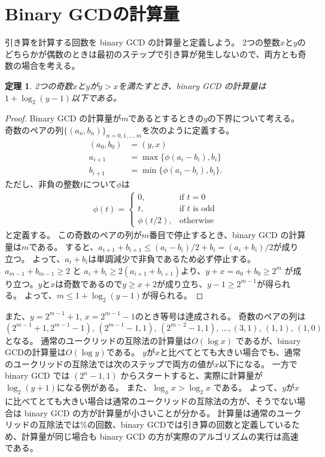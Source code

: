 \documentclass[a4paper,twoside,onecolumn,openany,article,10pt]{memoir}
\newtheorem{theorem}{定理}
\theoremstyle{remark}
\begin{document}
\section{Binary GCDの計算量}
引き算を計算する回数を binary GCD の計算量と定義しよう。
2つの整数$x$と$y$のどちらかが偶数のときは最初のステップで引き算が発生しないので、両方とも奇数の場合を考える。
\begin{theorem}
2つの奇数$x$と$y$が$y>x$を満たすとき、binary GCD の計算量は$1+\log_2(y-1)$以下である。
\end{theorem}
\begin{proof}
Binary GCD の計算量が$m$であるとするときの$y$の下界について考える。
奇数のペアの列$\{(a_n, b_n)\}_{n=0,1,\dotsc,m}$を次のように定義する。
\begin{align*}
(a_0, b_0) &= (y, x)\\
a_{i+1} &= \max\{\phi(a_{i}-b_{i}), b_i\}\\
b_{i+1} &= \min\{\phi(a_{i}-b_{i}), b_i\}.
\end{align*}
ただし、非負の整数$t$について$\phi$は
\begin{align*}
\phi(t)=\begin{cases}
0,&\text{if } t = 0\\
t,&\text{if $t$ is odd}\\
\phi(t/2),&\text{otherwise}
\end{cases}
\end{align*}
と定義する。
この奇数のペアの列が$m$番目で停止するとき、binary GCD の計算量は$m$である。
すると、$a_{i+1}+b_{i+1} \le (a_i-b_i)/2 + b_i = (a_i+b_i)/2$が成り立つ。
よって、$a_i+b_i$は単調減少で非負であるため必ず停止する。
$a_{m-1}+b_{m-1}\ge 2$ と $a_i+b_i\ge 2(a_{i+1}+b_{i+1})$より、$y+x=a_0+b_0\ge 2^{m}$
が成り立つ。$y$と$x$は奇数であるので$y\ge x+2$が成り立ち、$y-1\ge 2^{m-1}$が得られる。
よって、$m\le 1+\log_2(y-1)$が得られる。
\end{proof}
また、$y=2^{m-1}+1$, $x=2^{m-1}-1$のとき等号は達成される。
奇数のペアの列は
$(2^{m-1}+1, 2^{m-1}-1),\, (2^{m-1}-1, 1),\, (2^{m-2}-1, 1),\, \dotsc, (3,1),\, (1,1),\, (1,0)$
となる。
通常のユークリッドの互除法の計算量は$O(\log x)$ であるが、binary GCDの計算量は$O(\log y)$である。
$y$が$x$と比べてとても大きい場合でも、通常のユークリッドの互除法では次のステップで両方の値が$x$以下になる。
一方で binary GCD では $(2^n-1, 1)$ からスタートすると、実際に計算量が$\log_2 (y+1)$になる例がある。
また、$\log_\phi x > \log_2 x$ である。
よって、$y$が$x$に比べてとても大きい場合は通常のユークリッドの互除法の方が、そうでない場合は binary GCD の方が計算量が小さいことが分かる。
計算量は通常のユークリッドの互除法では\%の回数、binary GCDでは引き算の回数と定義しているため、計算量が同じ場合も binary GCD の方が実際のアルゴリズムの実行は高速である。
\end{document}
